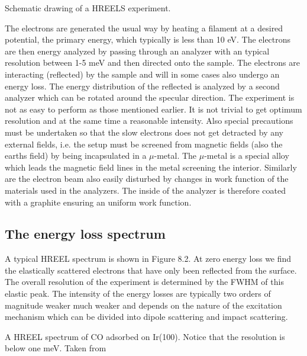 Schematic drawing of a HREELS experiment.

\vspace{1cm}

 The electrons are generated the usual way by heating a filament at a desired potential, the primary energy, which typically is less than 10 eV. The electrons are then energy analyzed by passing through an analyzer with an typical resolution between 1-5 meV and then  directed onto the sample. The electrons are interacting (reflected) by the sample and will in some cases also undergo an energy loss. The energy distribution of the reflected  is analyzed by a second analyzer which can be rotated around the specular direction. The experiment is not as easy to perform as those mentioned earlier. It is not trivial to get optimum resolution and at the same time a reasonable intensity. Also special precautions must be undertaken so that the slow electrons does not get detracted by any external fields, i.e. the setup must be screened from magnetic fields (also the earths field) by being incapsulated in a $\mu$-metal. The $\mu$-metal is a special alloy which leads the magnetic field lines in the metal screening the interior. Similarly are the electron beam also easily disturbed by changes in work function of the materials used in the analyzers. The inside of the analyzer is therefore  coated  with a graphite  ensuring an uniform work function.


\subsection{The energy loss spectrum}

 A typical HREEL spectrum is shown in Figure 8.2. At zero energy loss we find the elastically scattered electrons that have only been reflected from the surface. The overall resolution of the experiment is determined  by the FWHM of this elastic peak. The intensity of the energy losses are typically two orders of magnitude weaker much weaker and depends on the  nature of the excitation mechanism which can be  divided into dipole scattering and impact scattering.

\vspace*{11cm}

 A HREEL spectrum of CO adsorbed on Ir(100). Notice that the resolution is below one meV. Taken from \cite{Bruckmann}
\vspace{1cm}

